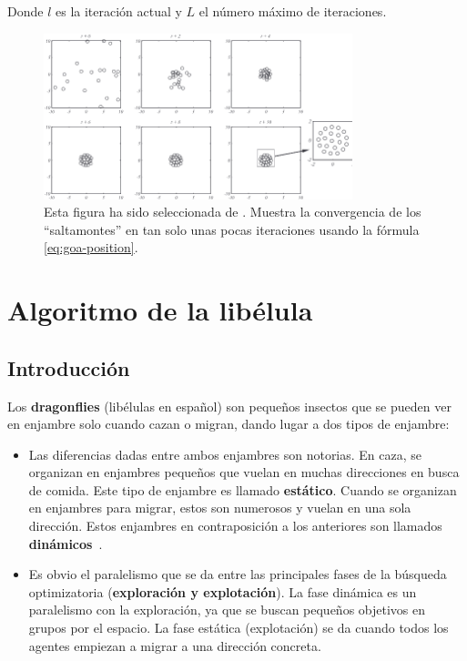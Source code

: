 Donde $l$ es la iteración actual y $L$ el número máximo de iteraciones.

\begin{figure}[H]
    \begin{center}
        \includegraphics[width=0.8\textwidth]{imagenes/goa-position-convergence.png}
    \end{center}
    \caption[Convergencia en GOA]{Esta figura ha sido seleccionada de \cite{saremi_grasshopper_2017}. Muestra la convergencia de los ``saltamontes'' en tan solo unas pocas iteraciones usando la fórmula \ref{eq:goa-position}.}
\end{figure}

\section{Algoritmo de la libélula}
\subsection{Introducción}
Los \textbf{dragonflies} (libélulas en español) son pequeños insectos que se pueden ver en enjambre solo cuando cazan o migran, dando lugar a dos tipos de enjambre:
\begin{itemize}
    \item Las diferencias dadas entre ambos enjambres son notorias. En caza, se organizan en enjambres pequeños que vuelan en muchas direcciones en busca de comida. Este tipo de enjambre es llamado \textbf{estático}. Cuando se organizan en enjambres para migrar, estos son numerosos y vuelan en una sola dirección. Estos enjambres en contraposición a los anteriores son llamados \textbf{dinámicos}~\cite{mirjalili_dragonfly_2016}.
    \item Es obvio el paralelismo que se da entre las principales fases de la búsqueda optimizatoria (\textbf{exploración y explotación}). La fase dinámica es un paralelismo con la exploración, ya que se buscan pequeños objetivos en grupos por el espacio. La fase estática (explotación) se da cuando todos los agentes empiezan a migrar a una dirección concreta.
\end{itemize}


